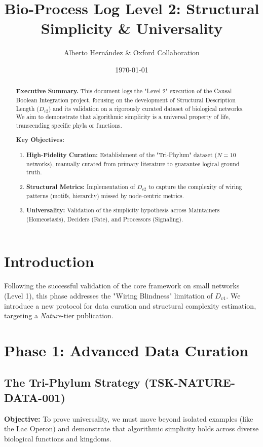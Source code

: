 \documentclass{article}
\title{Bio-Process Log Level 2: Structural Simplicity \& Universality}
\author{Alberto Hernández \& Oxford Collaboration}
\date{\today}
\begin{document}
\maketitle

\begin{abstract}
\textbf{Executive Summary.} This document logs the "Level 2" execution of the Causal Boolean Integration project, focusing on the development of Structural Description Length ($D_{v2}$) and its validation on a rigorously curated dataset of biological networks. We aim to demonstrate that algorithmic simplicity is a universal property of life, transcending specific phyla or functions.

\textbf{Key Objectives:}
\begin{enumerate}
    \item \textbf{High-Fidelity Curation:} Establishment of the "Tri-Phylum" dataset ($N=10$ networks), manually curated from primary literature to guarantee logical ground truth.
    \item \textbf{Structural Metrics:} Implementation of $D_{v2}$ to capture the complexity of wiring patterns (motifs, hierarchy) missed by node-centric metrics.
    \item \textbf{Universality:} Validation of the simplicity hypothesis across Maintainers (Homeostasis), Deciders (Fate), and Processors (Signaling).
\end{enumerate}
\end{abstract}

\section{Introduction}
Following the successful validation of the core framework on small networks (Level 1), this phase addresses the "Wiring Blindness" limitation of $D_{v1}$. We introduce a new protocol for data curation and structural complexity estimation, targeting a \textit{Nature}-tier publication.

\section{Phase 1: Advanced Data Curation}

\subsection{The Tri-Phylum Strategy (TSK-NATURE-DATA-001)}
\textbf{Objective:} To prove universality, we must move beyond isolated examples (like the Lac Operon) and demonstrate that algorithmic simplicity holds across diverse biological functions and kingdoms.
\end{document}
